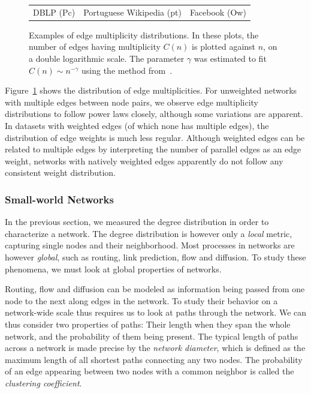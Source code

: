 \documentclass[11pt,a4paper]{book}
\begin{document}
\begin{figure}[h!]
\begin{tabular}{c c c}
    DBLP (\textsf{Pc}) &
    Portuguese Wikipedia (\textsf{pt}) &
    Facebook (\textsf{Ow})
  \end{tabular}
  \caption{
    Examples of edge multiplicity distributions.  
    In these plots, the number of edges having multiplicity $C(n)$ is
    plotted against $n$, on a double logarithmic scale. 
    The parameter $\gamma$ was estimated to fit $C(n) \sim n^{-\gamma}$
    using the method from~\cite{b408}.
  }
  \label{fig:multiplicity-distributions}
\end{figure}

Figure~\ref{fig:multiplicity-distributions} shows the distribution of
edge multiplicities. 
For unweighted networks with multiple edges between node pairs, we
observe edge multiplicity 
distributions to follow power laws closely, although some variations are
apparent. 
In datasets with weighted edges (of which none has multiple edges), the
distribution of edge weights is much less regular.  Although weighted
edges can be related to multiple edges by interpreting the number of
parallel edges as an edge weight, networks with natively weighted edges
apparently do not follow any consistent weight distribution. 

\subsubsection{Small-world Networks}
\label{sec:small-world}
In the previous section, we measured the degree distribution in order to
characterize a network.  The degree distribution is however
only a \emph{local} metric, capturing single nodes and their neighborhood.
Most processes in networks are however 
\emph{global}, such as routing, link prediction, flow and diffusion.  To study
these phenomena, we must look at global properties of networks. 

Routing, flow and diffusion can be modeled as information being passed
from one node to the next along edges in the network.  To study their behavior on a
network-wide scale thus requires us to look at paths through the
network. We can thus consider two properties of paths:  Their length when they
span the whole network, and the probability of them being present.   
The typical length of paths across a network is made precise by the
\emph{network diameter}, 
which is defined as the maximum length of all shortest paths connecting
any two nodes. 
The probability of an edge appearing between
two nodes with a common neighbor is called the \emph{clustering
  coefficient}. 
\end{document}

